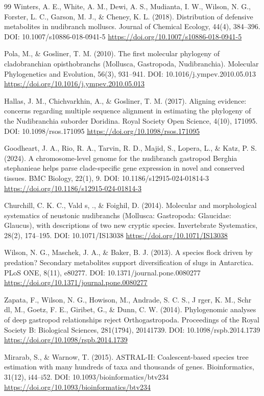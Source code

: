 \documentclass[10pt,letterpaper]{article}
\begin{document}
\begin{thebibliography}{99}
 Winters, A. E., White, A. M., Dewi, A. S., Mudianta, I. W., Wilson, N. G., Forster, L. C., Garson, M. J., \& Cheney, K. L. (2018). Distribution of defensive metabolites in nudibranch molluscs. Journal of Chemical Ecology, 44(4), 384--396. DOI: 10.1007/s10886-018-0941-5 \url{https://doi.org/10.1007/s10886-018-0941-5}

 Pola, M., \& Gosliner, T. M. (2010). The first molecular phylogeny of cladobranchian opisthobranchs (Mollusca, Gastropoda, Nudibranchia). Molecular Phylogenetics and Evolution, 56(3), 931--941. DOI: 10.1016/j.ympev.2010.05.013 \url{https://doi.org/10.1016/j.ympev.2010.05.013}

 Hallas, J. M., Chichvarkhin, A., \& Gosliner, T. M. (2017). Aligning evidence: concerns regarding multiple sequence alignment in estimating the phylogeny of the Nudibranchia suborder Doridina. Royal Society Open Science, 4(10), 171095. DOI: 10.1098/rsos.171095 \url{https://doi.org/10.1098/rsos.171095}

 Goodheart, J. A., Rio, R. A., Tarvin, R. D., Majid, S., Lopera, L., \& Katz, P. S. (2024). A chromosome-level genome for the nudibranch gastropod Berghia stephanieae helps parse clade-specific gene expression in novel and conserved tissues. BMC Biology, 22(1), 9. DOI: 10.1186/s12915-024-01814-3 \url{https://doi.org/10.1186/s12915-024-01814-3}

 Churchill, C. K. C., Vald s,  ., \&   Foighil, D. (2014). Molecular and morphological systematics of neustonic nudibranchs (Mollusca: Gastropoda: Glaucidae: Glaucus), with descriptions of two new cryptic species. Invertebrate Systematics, 28(2), 174--195. DOI: 10.1071/IS13038 \url{https://doi.org/10.1071/IS13038}

 Wilson, N. G., Maschek, J. A., \& Baker, B. J. (2013). A species flock driven by predation? Secondary metabolites support diversification of slugs in Antarctica. PLoS ONE, 8(11), e80277. DOI: 10.1371/journal.pone.0080277 \url{https://doi.org/10.1371/journal.pone.0080277}

 Zapata, F., Wilson, N. G., Howison, M., Andrade, S. C. S., J rger, K. M., Schr dl, M., Goetz, F. E., Giribet, G., \& Dunn, C. W. (2014). Phylogenomic analyses of deep gastropod relationships reject Orthogastropoda. Proceedings of the Royal Society B: Biological Sciences, 281(1794), 20141739. DOI: 10.1098/rspb.2014.1739 \url{https://doi.org/10.1098/rspb.2014.1739}

 Mirarab, S., \& Warnow, T. (2015). ASTRAL-II: Coalescent-based species tree estimation with many hundreds of taxa and thousands of genes. Bioinformatics, 31(12), i44--i52. DOI: 10.1093/bioinformatics/btv234 \url{https://doi.org/10.1093/bioinformatics/btv234}


\end{thebibliography}
\end{document}
